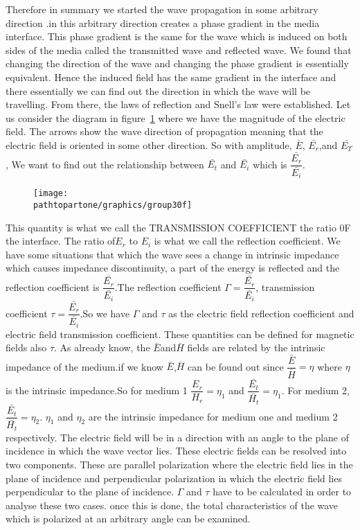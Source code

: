 Therefore in summary we started the wave propagation in some arbitrary direction .in this arbitrary direction creates a phase gradient in the media interface. This phase gradient is the same for the wave which is induced on both sides of the media called the transmitted wave and reflected wave. We found that changing the direction of the wave and changing the phase gradient is essentially equivalent. Hence the induced field has the same gradient in the interface and there essentially we can find out the direction in which the wave will be travelling. From there, the laws of reflection and Snell's law were established. Let us consider the diagram in figure~\ref{fig:group30f} where we have the magnitude of the electric field. The arrows show the wave direction of propagation meaning that the electric field is oriented in some other direction. So with amplitude, $\bar{E}$, $\bar{E_r}$,and $\bar{E_T}$, We want to find out the relationship between $\bar{E_t}$ and $\bar{E_i}$ which is $\dfrac{\bar{E_r}}{\bar{E_i}}$.
\begin{figure}[h]
\centering
\texttt{[image: \\pathtopartone/graphics/group30f]}
\caption{}
\label{fig:group30f}
\end{figure}

This quantity is what we call the TRANSMISSION COEFFICIENT the ratio 0F the interface. The ratio of$ E_r$ to $E_i$ is what we call the reflection coefficient. We have some situations that which the wave sees a change in intrinsic impedance which causes impedance discontinuity, a part of the energy is reflected and the reflection coefficient is $\dfrac{\bar{E_r}}{\bar{E_i}}$.The reflection coefficient $\Gamma=\dfrac{\bar{E_r}}{\bar{E_i}}$, transmission coefficient $\tau=\dfrac{\bar{E_r}}{\bar{E_i}}$.So we have $\Gamma$ and $\tau$ as the electric field reflection coefficient and electric field transmission coefficient. These quantities can be defined for magnetic fields also $\tau$. As already know, the $\bar{E}$and$\bar{ H}$ fields are related by the intrinsic impedance of the medium.if we know $\bar{E}$,$\bar{H}$ can be found out since $\dfrac{\bar{E}}{\bar{H}}=\eta$ where $\eta$ is the intrinsic impedance.So for medium 1 $\dfrac{E_r}{H_r}=\eta_1$  and $\dfrac{\bar{E_t}}{\bar{H_t}}=\eta_1$. For medium 2,$\dfrac{\bar{E_t}}{\bar{H_t}}=\eta_2$. $\eta_1$ and $\eta_2$ are the intrinsic impedance for medium one and medium 2 respectively. The electric field will be in a direction with an angle to the plane of incidence in which the wave vector lies. These electric fields can be resolved into two components. These are parallel polarization where the electric field lies in the plane of incidence and perpendicular polarization in which the electric field lies perpendicular to the plane of incidence. $\Gamma$ and $\tau$ have to be calculated in order to analyse these two cases. once this is done, the total characteristics of the wave which is polarized at an arbitrary angle can be examined.